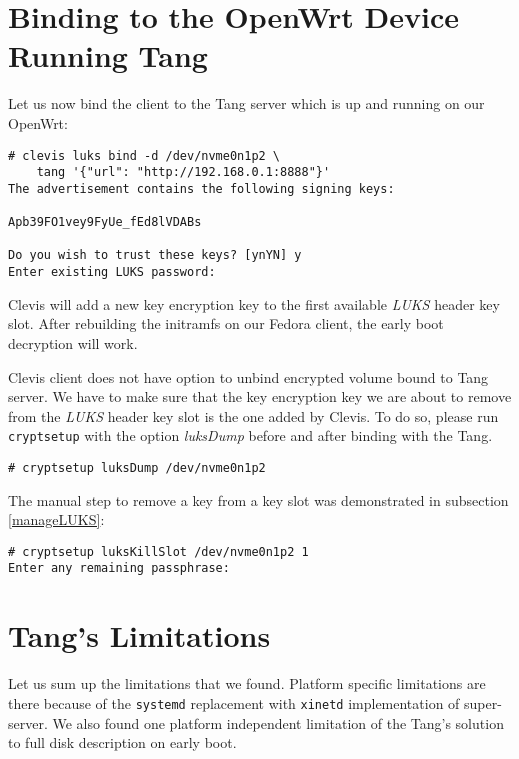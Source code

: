 \section{Binding to the OpenWrt Device Running Tang}
Let us now bind the client to the Tang server which is up and running on our OpenWrt:
\begin{lstlisting}[columns=fixed,basicstyle=\ttfamily\footnotesize,tabsize=4,backgroundcolor=\color{yellow!10}]
# clevis luks bind -d /dev/nvme0n1p2 \
    tang '{"url": "http://192.168.0.1:8888"}'
The advertisement contains the following signing keys:

Apb39FO1vey9FyUe_fEd8lVDABs

Do you wish to trust these keys? [ynYN] y
Enter existing LUKS password:
\end{lstlisting}
Clevis will add a new key encryption key to the first available {\it LUKS} header key slot.
After rebuilding the initramfs on our Fedora client, the early boot decryption will work.

Clevis client does not have option to unbind encrypted volume bound to Tang server.
We have to make sure that the key encryption key we are about to remove from the {\it LUKS} header key slot is the one added by Clevis.
To do so, please run {\tt cryptsetup} with the option {\it luksDump} before and after binding with the Tang.
\begin{lstlisting}[columns=fixed,basicstyle=\ttfamily\footnotesize,tabsize=4,backgroundcolor=\color{yellow!10}]
# cryptsetup luksDump /dev/nvme0n1p2
\end{lstlisting}
The manual step to remove a key from a key slot was demonstrated in subsection \ref{manageLUKS}:
\begin{lstlisting}[columns=fixed,basicstyle=\ttfamily\footnotesize,tabsize=4,backgroundcolor=\color{yellow!10}]
# cryptsetup luksKillSlot /dev/nvme0n1p2 1
Enter any remaining passphrase:
\end{lstlisting}

\section{Tang's Limitations}\label{limitations}

Let us sum up the limitations that we found.
Platform specific limitations are there because of the {\tt systemd} replacement with {\tt xinetd} implementation of super-server.
We also found one platform independent limitation of the Tang's solution to full disk description on early boot.


